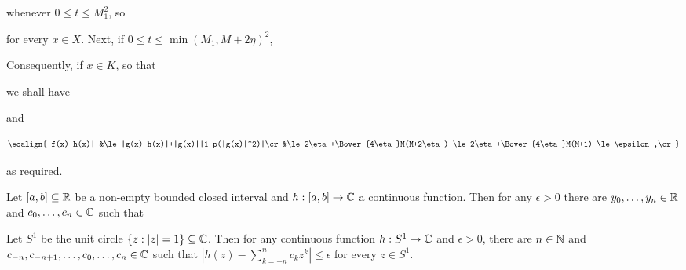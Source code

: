 {\noindent whenever $0\le t\le M_1^2$, so 
      
      
      
\noindent for every $x\in X$.    Next, if $0\le t\le\min(M_1,M+2\eta)^2$, 
      
      
\noindent    Consequently, if $x\in K$, so that 
      
      
\noindent we shall have 
      
      
\noindent and 
      
$$\eqalign{|f(x)-h(x)| 
&\le|g(x)-h(x)|+|g(x)||1-p(|g(x)|^2)|\cr 
&\le 2\eta+\Bover{4\eta}M(M+2\eta) 
\le 2\eta+\Bover{4\eta}M(M+1) 
\le\epsilon,\cr}$$ 
      
\noindent as required. 
}%
      
      
 Let $[a,b]\subseteq\Bbb R$ be a 
non-empty bounded closed interval and $h:[a,b]\to\Bbb C$ a continuous 
function.   Then for any $\epsilon>0$ there are $y_0,\ldots,y_n\in\Bbb 
R$ and $c_0,\ldots,c_n\in\Bbb C$ such that 
      
      
      
      
 Let $S^1$ be the unit circle 
$\{z:|z|=1\}\subseteq\Bbb C$.   Then for any continuous function 
$h:S^1\to\Bbb C$ and $\epsilon>0$, there are $n\in\Bbb N$ and 
$c_{-n},c_{-n+1},\ldots,c_0,\ldots,c_n\in\Bbb C$ such that 
$|h(z)-\sum_{k=-n}^nc_kz^k|\le\epsilon$ for every $z\in S^1$. 
      
